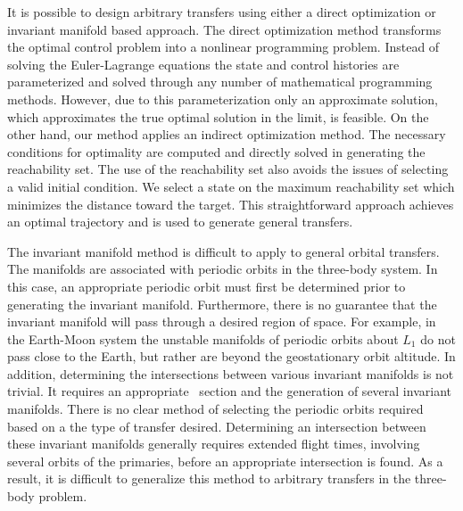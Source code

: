 \documentclass[smallcondensed]{svjour3}
\begin{document}
It is possible to design arbitrary transfers using either a direct optimization or invariant manifold based approach.
The direct optimization method transforms the optimal control problem into a nonlinear programming problem.
Instead of solving the Euler-Lagrange equations the state and control histories are parameterized and solved through any number of mathematical programming methods.
However, due to this parameterization only an approximate solution, which approximates the true optimal solution in the limit, is feasible. 
On the other hand, our method applies an indirect optimization method.
The necessary conditions for optimality are computed and directly solved in generating the reachability set. 
The use of the reachability set also avoids the issues of selecting a valid initial condition.
We select a state on the maximum reachability set which minimizes the distance toward the target. 
This straightforward approach achieves an optimal trajectory and is used to generate general transfers.

The invariant manifold method is difficult to apply to general orbital transfers. 
The manifolds are associated with periodic orbits in the three-body system. 
In this case, an appropriate periodic orbit must first be determined prior to generating the invariant manifold.
Furthermore, there is no guarantee that the invariant manifold will pass through a desired region of space. 
For example, in the Earth-Moon system the unstable manifolds of periodic orbits about \( L_1 \) do not pass close to the Earth, but rather are beyond the geostationary orbit altitude. 
In addition, determining the intersections between various invariant manifolds is not trivial. 
It requires an appropriate \Poincare~section and the generation of several invariant manifolds.
There is no clear method of selecting the periodic orbits required based on a the type of transfer desired. 
Determining an intersection between these invariant manifolds generally requires extended flight times, involving several orbits of the primaries, before an appropriate intersection is found.
As a result, it is difficult to generalize this method to arbitrary transfers in the three-body problem.
\end{document}
